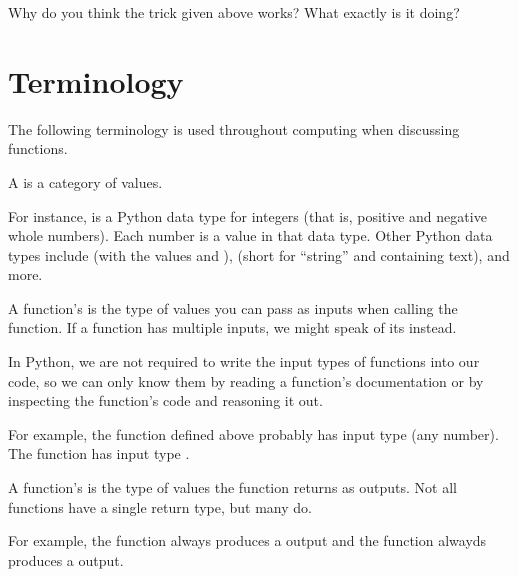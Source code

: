 \documentclass[letterpaper,10pt,english]{jupyterBook}
\begin{document}
\sphinxAtStartPar
Why do you think the  trick given above works?  What exactly is it doing?


\section{Terminology}
\label{\detokenize{chapter-2-mathematical-foundations:terminology}}
\sphinxAtStartPar
The following terminology is used throughout computing when discussing functions.

\sphinxAtStartPar
{} A  is a category of values.

\sphinxAtStartPar
For instance,  is a Python data type for integers (that is, positive and negative whole numbers).  Each number is a value in that data type.  Other Python data types include  (with the values  and ),  (short for “string” and containing text), and more.

\sphinxAtStartPar
{} A function’s  is the type of values you can pass as inputs when calling the function.  If a function has multiple inputs, we might speak of its  instead.

\sphinxAtStartPar
In Python, we are not required to write the input types of functions into our code, so we can only know them by reading a function’s documentation or by inspecting the function’s code and reasoning it out.

\sphinxAtStartPar
For example, the  function defined above probably has input type  (any number).  The  function has input type .

\sphinxAtStartPar
{} A function’s  is the type of values the function returns as outputs.  Not all functions have a single return type, but many do.

\sphinxAtStartPar
For example, the  function always produces a  output and the  function alwayds produces a  output.
\end{document}
